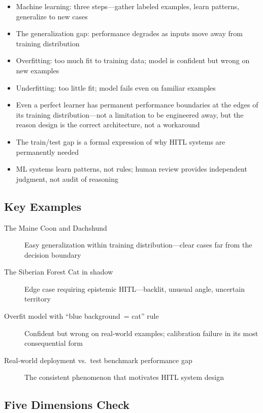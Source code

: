 \begin{keyconcept}
\begin{itemize}
    \item Machine learning: three steps---gather labeled examples, learn patterns, generalize to new cases
    \item The generalization gap: performance degrades as inputs move away from training distribution
    \item Overfitting: too much fit to training data; model is confident but wrong on new examples
    \item Underfitting: too little fit; model fails even on familiar examples
    \item Even a perfect learner has permanent performance boundaries at the edges of its training distribution---not a limitation to be engineered away, but the reason \hitl design is the correct architecture, not a workaround
    \item The train/test gap is a formal expression of why HITL systems are permanently needed
    \item ML systems learn patterns, not rules; human review provides independent judgment, not audit of reasoning
\end{itemize}
\end{keyconcept}

\subsection*{Key Examples}

\begin{description}
    \item[The Maine Coon and Dachshund] Easy generalization within training distribution---clear cases far from the decision boundary
    \item[The Siberian Forest Cat in shadow] Edge case requiring epistemic HITL---backlit, unusual angle, uncertain territory
    \item[Overfit model with ``blue background~= cat'' rule] Confident but wrong on real-world examples; calibration failure in its most consequential form
    \item[Real-world deployment vs.\ test benchmark performance gap] The consistent phenomenon that motivates HITL system design
\end{description}

\subsection*{Five Dimensions Check}

